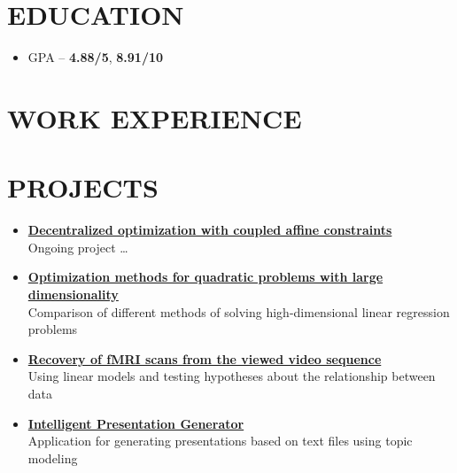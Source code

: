 \documentclass[11pt]{moderncv}
\begin{document}
    \makecvtitle

    \section{EDUCATION}

        \begin{itemize}
            \item GPA -- \textbf{4.88/5}, \textbf{8.91/10}
        \end{itemize}

    \section{WORK EXPERIENCE}


    \section{PROJECTS}

    \begin{itemize}
        \item \href{https://github.com/kisnikser/Decentralized-Optimization}{\textbf{Decentralized optimization with coupled affine constraints}}\\
        Ongoing project \dots
        \item \href{https://github.com/kisnikser/Optimization-Methods}{\textbf{Optimization methods for quadratic problems with large dimensionality}}\\
        Comparison of different methods of solving high-dimensional linear regression problems
        \item \href{https://github.com/intsystems/2023-Project-112}{\textbf{Recovery of fMRI scans from the viewed video sequence}}\\
        Using linear models and testing hypotheses about the relationship between data
        \item \href{https://github.com/kisnikser/Intelligent-Presentation-Generator}{\textbf{Intelligent Presentation Generator}}\\
        Application for generating presentations based on text files using topic modeling
    \end{itemize}   
\end{document}
